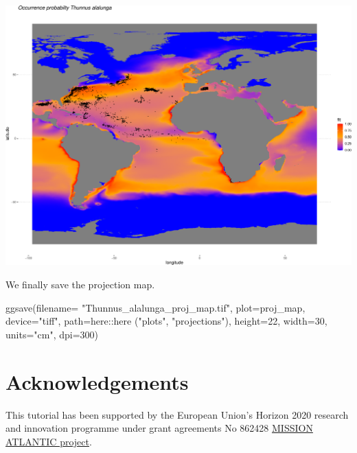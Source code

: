 \documentclass[
]{book}
\newenvironment{Shaded}{\begin{snugshade}}{\end{snugshade}}
\newcommand{\AttributeTok}[1]{\textcolor[rgb]{0.77,0.63,0.00}{#1}}
\newcommand{\DecValTok}[1]{\textcolor[rgb]{0.00,0.00,0.81}{#1}}
\newcommand{\FunctionTok}[1]{\textcolor[rgb]{0.00,0.00,0.00}{#1}}
\newcommand{\NormalTok}[1]{#1}
\newcommand{\SpecialCharTok}[1]{\textcolor[rgb]{0.00,0.00,0.00}{#1}}
\newcommand{\StringTok}[1]{\textcolor[rgb]{0.31,0.60,0.02}{#1}}
\begin{document}
\includegraphics{_main_files/figure-latex/unnamed-chunk-93-1.pdf}

We finally save the projection map.

\begin{Shaded}
\begin{Highlighting}[]
\FunctionTok{ggsave}\NormalTok{(}\AttributeTok{filename=} \StringTok{"Thunnus\_alalunga\_proj\_map.tif"}\NormalTok{, }
        \AttributeTok{plot=}\NormalTok{proj\_map, }
        \AttributeTok{device=}\StringTok{"tiff"}\NormalTok{,}
        \AttributeTok{path=}\NormalTok{here}\SpecialCharTok{::}\FunctionTok{here}\NormalTok{ (}\StringTok{"plots"}\NormalTok{, }\StringTok{"projections"}\NormalTok{), }
        \AttributeTok{height=}\DecValTok{22}\NormalTok{, }\AttributeTok{width=}\DecValTok{30}\NormalTok{,}
        \AttributeTok{units=}\StringTok{"cm"}\NormalTok{, }\AttributeTok{dpi=}\DecValTok{300}\NormalTok{)}
\end{Highlighting}
\end{Shaded}

\hypertarget{acknowledgements}{%
\chapter{Acknowledgements}\label{acknowledgements}}

This tutorial has been supported by the European Union's Horizon 2020 research and innovation programme under grant agreements No 862428 \href{https://missionatlantic.eu/}{MISSION ATLANTIC project}.

  
\end{document}
